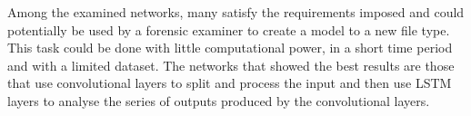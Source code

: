 Among the examined networks, many satisfy the requirements imposed and could potentially be used by a forensic examiner to create a model to a new file type. This task could be done with little computational power, in a short time period and with a limited dataset. The networks that showed the best results are those that use convolutional layers to split and process the input and then use LSTM layers to analyse the series of outputs produced by the convolutional layers.